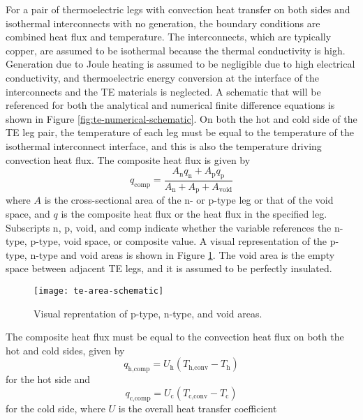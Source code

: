 \documentclass[preprint,authoryear,12pt]{elsarticle}
\begin{document}
For a pair of thermoelectric legs with convection heat transfer on
both sides and isothermal interconnects with no generation, the
boundary conditions are combined heat flux and temperature.  The
interconnects, which are typically copper, are assumed to be
isothermal because the thermal conductivity is high. Generation due to
Joule heating is assumed to be negligible due to high electrical
conductivity, and thermoelectric energy conversion at the interface of
the interconnects and the TE materials is neglected.  A schematic that
will be referenced for both the analytical and numerical finite
difference equations is shown in Figure
\ref{fig:te-numerical-schematic}.  On both the hot and cold side of
the TE leg pair, the temperature of each leg must be equal to the
temperature of the isothermal interconnect interface, and this is also
the temperature driving convection heat flux.  The composite heat flux
is given by
\begin{equation}
  \label{eq:q-composite-definition}
  q_{\text{comp}} = \frac{A_\text{n} q_\text{n} + A_\text{p}
    q_\text{p}}{A_\text{n} + A_\text{p} + A_{\text{void}}} 
\end{equation}
where $A$ is the cross-sectional area of the n- or p-type leg or that
of the void space, and $q$ is the composite heat flux or the heat flux
in the specified leg.  Subscripts n, p, void, and comp indicate
whether the variable references the n-type, p-type, void space, or
composite value.  A visual representation of the p-type, n-type and
void areas is shown in Figure \ref{fig:te-area-visual}.  The void area
is the empty space between adjacent TE legs, and it is assumed to be
perfectly insulated.
\begin{figure}[H]
  \centering
  \texttt{[image: te-area-schematic]}
  \caption{Visual reprentation of p-type, n-type, and void areas.}
  \label{fig:te-area-visual}
\end{figure}
\noindent%
The composite heat flux must be equal to the convection heat flux on
both the hot and cold sides, given by
\begin{equation}
  \label{eq:conv-flux-hot}
  q_\text{h,comp} = U_\text{h} \left( T_{\text{h,conv}} - T_\text{h}
  \right)   
\end{equation}
for the hot side and
\begin{equation}
  \label{eq:conv-flux-cold}
  q_\text{c,comp} = U_\text{c} \left( T_{\text{c,conv}} - T_\text{c}
  \right)   
\end{equation}
for the cold side, where $U$ is the overall heat transfer coefficient
\end{document}
